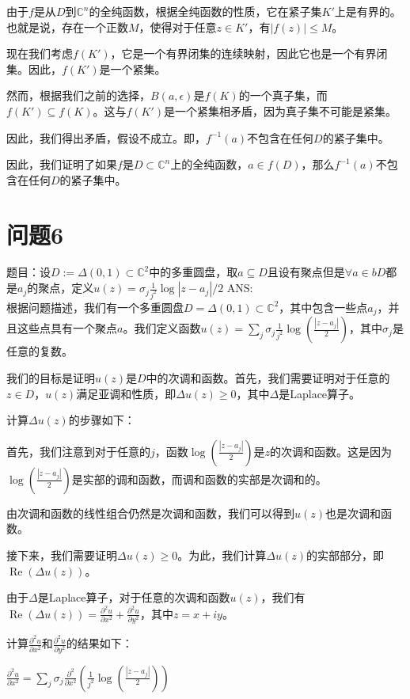 \documentclass[12pt, a4paper, oneside]{article}
\begin{document}
\begin{spacing}{2.0}
由于$f$是从$D$到$\mathbb{C}^n$的全纯函数，根据全纯函数的性质，它在紧子集$K'$上是有界的。也就是说，存在一个正数$M$，使得对于任意$z\in K'$，有$|f(z)|\leq M$。

现在我们考虑$f(K')$，它是一个有界闭集的连续映射，因此它也是一个有界闭集。因此，$f(K')$是一个紧集。

然而，根据我们之前的选择，$B(a,\epsilon)$是$f(K)$的一个真子集，而$f(K')\subseteq f(K)$。这与$f(K')$是一个紧集相矛盾，因为真子集不可能是紧集。

因此，我们得出矛盾，假设不成立。即，$f^{-1}(a)$不包含在任何$D$的紧子集中。

因此，我们证明了如果$f$是$D\subset \mathbb{C}^n$上的全纯函数，$a\in f(D)$，那么$f^{-1}(a)$不包含在任何$D$的紧子集中。
\section{问题6}
题目：设$D := \Delta(0, 1) \subset \mathbb{C} ^2$中的多重圆盘，取${a}\subseteq D$且设有聚点但是$\forall a\in bD$都是${a_j}$的聚点，定义$u(z) = \sigma_j \frac{1}{j^2}\log{|z-a_j|/2}$
ANS:\\
根据问题描述，我们有一个多重圆盘$D = \Delta(0, 1) \subset \mathbb{C}^2$，其中包含一些点$a_j$，并且这些点具有一个聚点$a$。我们定义函数$u(z) = \sum_{j}\sigma_j \frac{1}{j^2}\log\left(\frac{|z-a_j|}{2}\right)$，其中$\sigma_j$是任意的复数。

我们的目标是证明$u(z)$是$D$中的次调和函数。首先，我们需要证明对于任意的$z\in D$，$u(z)$满足亚调和性质，即$\Delta u(z) \geq 0$，其中$\Delta$是Laplace算子。

计算$\Delta u(z)$的步骤如下：

首先，我们注意到对于任意的$j$，函数$\log\left(\frac{|z-a_j|}{2}\right)$是$z$的次调和函数。这是因为$\log\left(\frac{|z-a_j|}{2}\right)$是实部的调和函数，而调和函数的实部是次调和的。

由次调和函数的线性组合仍然是次调和函数，我们可以得到$u(z)$也是次调和函数。

接下来，我们需要证明$\Delta u(z) \geq 0$。为此，我们计算$\Delta u(z)$的实部部分，即$\operatorname{Re}(\Delta u(z))$。

由于$\Delta$是Laplace算子，对于任意的次调和函数$u(z)$，我们有$\operatorname{Re}(\Delta u(z)) = \frac{\partial^2 u}{\partial x^2} + \frac{\partial^2 u}{\partial y^2}$，其中$z = x+iy$。

计算$\frac{\partial^2 u}{\partial x^2}$和$\frac{\partial^2 u}{\partial y^2}$的结果如下：
\begin{center}
    $\frac{\partial^2u}{\partial x^2}=\sum_j\sigma_j\frac{\partial^2}{\partial x^2}\left(\frac{1}{j^2}\log\left(\frac{|z-a_j|}{2}\right)\right)$
\end{center}


\end{spacing}
\end{document}
